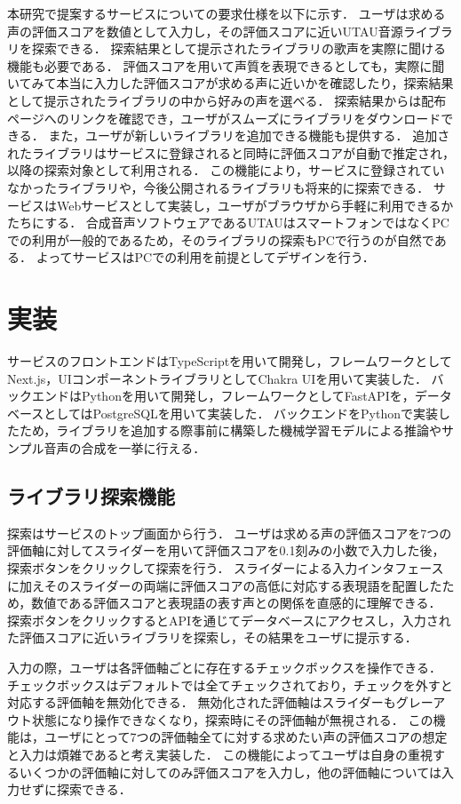 本研究で提案するサービスについての要求仕様を以下に示す．
ユーザは求める声の評価スコアを数値として入力し，その評価スコアに近いUTAU音源ライブラリを探索できる．
探索結果として提示されたライブラリの歌声を実際に聞ける機能も必要である．
評価スコアを用いて声質を表現できるとしても，実際に聞いてみて本当に入力した評価スコアが求める声に近いかを確認したり，探索結果として提示されたライブラリの中から好みの声を選べる．
探索結果からは配布ページへのリンクを確認でき，ユーザがスムーズにライブラリをダウンロードできる．
また，ユーザが新しいライブラリを追加できる機能も提供する．
追加されたライブラリはサービスに登録されると同時に評価スコアが自動で推定され，以降の探索対象として利用される．
この機能により，サービスに登録されていなかったライブラリや，今後公開されるライブラリも将来的に探索できる．
サービスはWebサービスとして実装し，ユーザがブラウザから手軽に利用できるかたちにする．
合成音声ソフトウェアであるUTAUはスマートフォンではなくPCでの利用が一般的であるため，そのライブラリの探索もPCで行うのが自然である．
よってサービスはPCでの利用を前提としてデザインを行う．

\section{実装}
サービスのフロントエンドはTypeScriptを用いて開発し，フレームワークとしてNext.js，UIコンポーネントライブラリとしてChakra UIを用いて実装した．
バックエンドはPythonを用いて開発し，フレームワークとしてFastAPIを，データベースとしてはPostgreSQLを用いて実装した．
バックエンドをPythonで実装したため，ライブラリを追加する際事前に構築した機械学習モデルによる推論やサンプル音声の合成を一挙に行える．

\subsection{ライブラリ探索機能}

探索はサービスのトップ画面から行う．
ユーザは求める声の評価スコアを7つの評価軸に対してスライダーを用いて評価スコアを0.1刻みの小数で入力した後，探索ボタンをクリックして探索を行う．
スライダーによる入力インタフェースに加えそのスライダーの両端に評価スコアの高低に対応する表現語を配置したため，数値である評価スコアと表現語の表す声との関係を直感的に理解できる．
探索ボタンをクリックするとAPIを通じてデータベースにアクセスし，入力された評価スコアに近いライブラリを探索し，その結果をユーザに提示する．

入力の際，ユーザは各評価軸ごとに存在するチェックボックスを操作できる．
チェックボックスはデフォルトでは全てチェックされており，チェックを外すと対応する評価軸を無効化できる．
無効化された評価軸はスライダーもグレーアウト状態になり操作できなくなり，探索時にその評価軸が無視される．
この機能は，ユーザにとって7つの評価軸全てに対する求めたい声の評価スコアの想定と入力は煩雑であると考え実装した．
この機能によってユーザは自身の重視するいくつかの評価軸に対してのみ評価スコアを入力し，他の評価軸については入力せずに探索できる．

